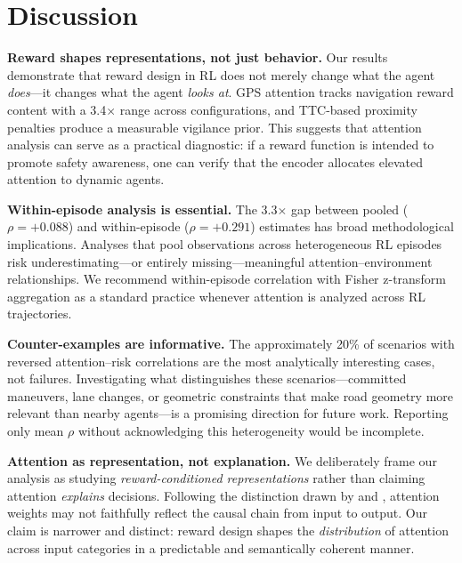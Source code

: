 \documentclass[10pt]{article} %
\begin{document}
\section{Discussion}
\label{sec:discussion}

\textbf{Reward shapes representations, not just behavior.} Our results demonstrate that reward design in RL does not merely change what the agent \textit{does}---it changes what the agent \textit{looks at}. GPS attention tracks navigation reward content with a 3.4$\times$ range across configurations, and TTC-based proximity penalties produce a measurable vigilance prior. This suggests that attention analysis can serve as a practical diagnostic: if a reward function is intended to promote safety awareness, one can verify that the encoder allocates elevated attention to dynamic agents.

\textbf{Within-episode analysis is essential.} The 3.3$\times$ gap between pooled ($\rho{=}+0.088$) and within-episode ($\rho{=}+0.291$) estimates has broad methodological implications. Analyses that pool observations across heterogeneous RL episodes risk underestimating---or entirely missing---meaningful attention--environment relationships. We recommend within-episode correlation with Fisher z-transform aggregation as a standard practice whenever attention is analyzed across RL trajectories.

\textbf{Counter-examples are informative.} The approximately 20\% of scenarios with reversed attention--risk correlations are the most analytically interesting cases, not failures. Investigating what distinguishes these scenarios---committed maneuvers, lane changes, or geometric constraints that make road geometry more relevant than nearby agents---is a promising direction for future work. Reporting only mean $\rho$ without acknowledging this heterogeneity would be incomplete.

\textbf{Attention as representation, not explanation.} We deliberately frame our analysis as studying \textit{reward-conditioned representations} rather than claiming attention \textit{explains} decisions. Following the distinction drawn by \citet{jain2019attention} and \citet{wiegreffe2019attention}, attention weights may not faithfully reflect the causal chain from input to output. Our claim is narrower and distinct: reward design shapes the \textit{distribution} of attention across input categories in a predictable and semantically coherent manner.
\end{document}

